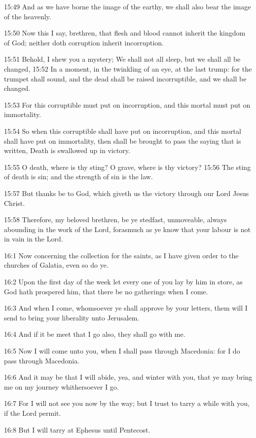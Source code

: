 15:49 And as we have borne the image of the earthy, we shall also bear
the image of the heavenly.

15:50 Now this I say, brethren, that flesh and blood cannot inherit
the kingdom of God; neither doth corruption inherit incorruption.

15:51 Behold, I shew you a mystery; We shall not all sleep, but we
shall all be changed, 15:52 In a moment, in the twinkling of an eye,
at the last trump: for the trumpet shall sound, and the dead shall be
raised incorruptible, and we shall be changed.

15:53 For this corruptible must put on incorruption, and this mortal
must put on immortality.

15:54 So when this corruptible shall have put on incorruption, and
this mortal shall have put on immortality, then shall be brought to
pass the saying that is written, Death is swallowed up in victory.

15:55 O death, where is thy sting? O grave, where is thy victory?
15:56 The sting of death is sin; and the strength of sin is the law.

15:57 But thanks be to God, which giveth us the victory through our
Lord Jesus Christ.

15:58 Therefore, my beloved brethren, be ye stedfast, unmoveable,
always abounding in the work of the Lord, forasmuch as ye know that
your labour is not in vain in the Lord.

16:1 Now concerning the collection for the saints, as I have given
order to the churches of Galatia, even so do ye.

16:2 Upon the first day of the week let every one of you lay by him in
store, as God hath prospered him, that there be no gatherings when I
come.

16:3 And when I come, whomsoever ye shall approve by your letters,
them will I send to bring your liberality unto Jerusalem.

16:4 And if it be meet that I go also, they shall go with me.

16:5 Now I will come unto you, when I shall pass through Macedonia:
for I do pass through Macedonia.

16:6 And it may be that I will abide, yea, and winter with you, that
ye may bring me on my journey whithersoever I go.

16:7 For I will not see you now by the way; but I trust to tarry a
while with you, if the Lord permit.

16:8 But I will tarry at Ephesus until Pentecost.

